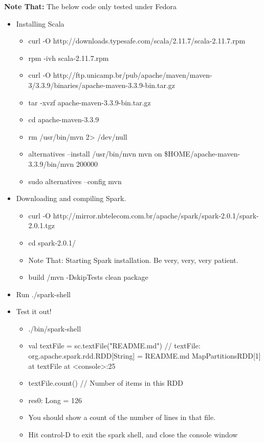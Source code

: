 \documentclass[]{article}
\begin{document}
\textbf{Note That:} The below code only tested under Fedora

\begin{itemize}
	\item Installing Scala
		\begin{itemize}
			\item curl -O http://downloads.typesafe.com/scala/2.11.7/scala-2.11.7.rpm	
			\item rpm -ivh scala-2.11.7.rpm
			\item curl -O http://ftp.unicamp.br/pub/apache/maven/maven-3/3.3.9/binaries/apache-maven-3.3.9-bin.tar.gz
			\item tar -xvzf apache-maven-3.3.9-bin.tar.gz 
			\item cd apache-maven-3.3.9
			\item rm /usr/bin/mvn 2> /dev/null
			\item alternatives --install /usr/bin/mvn mvn on \$HOME/apache-maven-3.3.9/bin/mvn 200000
			\item sudo alternatives --config mvn
		\end{itemize}
	\item Downloading and compiling Spark.
		\begin{itemize}
			\item curl -O http://mirror.nbtelecom.com.br/apache/spark/spark-2.0.1/spark-2.0.1.tgz
			\item cd spark-2.0.1/
			\item Note That: Starting Spark installation. Be very, very, very patient.
			\item build /mvn -DskipTests clean package
			\end{itemize}	
		\item Run ./spark-shell
		\item Test it out!
			\begin{itemize}
					\item ./bin/spark-shell

					\item val textFile = sc.textFile("README.md") // textFile: org.apache.spark.rdd.RDD[String] = README.md MapPartitionsRDD[1] at textFile at <console>:25


					\item textFile.count() // Number of items in this RDD
					\item res0: Long = 126

					\item You should show a count of the number of lines in that file.
					\item Hit control-D to exit the spark shell, and close the console window
			\end{itemize}
		
	
\end{itemize}
\end{document}

